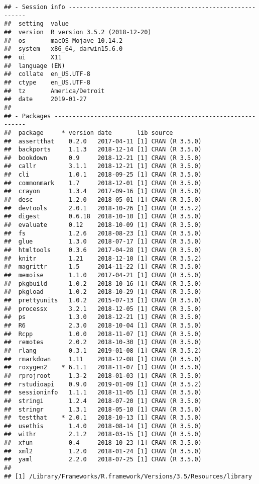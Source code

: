\documentclass[]{book}
\begin{document}
\begin{verbatim}
## - Session info ----------------------------------------------------------
##  setting  value                       
##  version  R version 3.5.2 (2018-12-20)
##  os       macOS Mojave 10.14.2        
##  system   x86_64, darwin15.6.0        
##  ui       X11                         
##  language (EN)                        
##  collate  en_US.UTF-8                 
##  ctype    en_US.UTF-8                 
##  tz       America/Detroit             
##  date     2019-01-27                  
## 
## - Packages --------------------------------------------------------------
##  package     * version date       lib source        
##  assertthat    0.2.0   2017-04-11 [1] CRAN (R 3.5.0)
##  backports     1.1.3   2018-12-14 [1] CRAN (R 3.5.0)
##  bookdown      0.9     2018-12-21 [1] CRAN (R 3.5.0)
##  callr         3.1.1   2018-12-21 [1] CRAN (R 3.5.0)
##  cli           1.0.1   2018-09-25 [1] CRAN (R 3.5.0)
##  commonmark    1.7     2018-12-01 [1] CRAN (R 3.5.0)
##  crayon        1.3.4   2017-09-16 [1] CRAN (R 3.5.0)
##  desc          1.2.0   2018-05-01 [1] CRAN (R 3.5.0)
##  devtools      2.0.1   2018-10-26 [1] CRAN (R 3.5.2)
##  digest        0.6.18  2018-10-10 [1] CRAN (R 3.5.0)
##  evaluate      0.12    2018-10-09 [1] CRAN (R 3.5.0)
##  fs            1.2.6   2018-08-23 [1] CRAN (R 3.5.0)
##  glue          1.3.0   2018-07-17 [1] CRAN (R 3.5.0)
##  htmltools     0.3.6   2017-04-28 [1] CRAN (R 3.5.0)
##  knitr         1.21    2018-12-10 [1] CRAN (R 3.5.2)
##  magrittr      1.5     2014-11-22 [1] CRAN (R 3.5.0)
##  memoise       1.1.0   2017-04-21 [1] CRAN (R 3.5.0)
##  pkgbuild      1.0.2   2018-10-16 [1] CRAN (R 3.5.0)
##  pkgload       1.0.2   2018-10-29 [1] CRAN (R 3.5.0)
##  prettyunits   1.0.2   2015-07-13 [1] CRAN (R 3.5.0)
##  processx      3.2.1   2018-12-05 [1] CRAN (R 3.5.0)
##  ps            1.3.0   2018-12-21 [1] CRAN (R 3.5.0)
##  R6            2.3.0   2018-10-04 [1] CRAN (R 3.5.0)
##  Rcpp          1.0.0   2018-11-07 [1] CRAN (R 3.5.0)
##  remotes       2.0.2   2018-10-30 [1] CRAN (R 3.5.0)
##  rlang         0.3.1   2019-01-08 [1] CRAN (R 3.5.2)
##  rmarkdown     1.11    2018-12-08 [1] CRAN (R 3.5.0)
##  roxygen2    * 6.1.1   2018-11-07 [1] CRAN (R 3.5.0)
##  rprojroot     1.3-2   2018-01-03 [1] CRAN (R 3.5.0)
##  rstudioapi    0.9.0   2019-01-09 [1] CRAN (R 3.5.2)
##  sessioninfo   1.1.1   2018-11-05 [1] CRAN (R 3.5.0)
##  stringi       1.2.4   2018-07-20 [1] CRAN (R 3.5.0)
##  stringr       1.3.1   2018-05-10 [1] CRAN (R 3.5.0)
##  testthat    * 2.0.1   2018-10-13 [1] CRAN (R 3.5.0)
##  usethis       1.4.0   2018-08-14 [1] CRAN (R 3.5.0)
##  withr         2.1.2   2018-03-15 [1] CRAN (R 3.5.0)
##  xfun          0.4     2018-10-23 [1] CRAN (R 3.5.0)
##  xml2          1.2.0   2018-01-24 [1] CRAN (R 3.5.0)
##  yaml          2.2.0   2018-07-25 [1] CRAN (R 3.5.0)
## 
## [1] /Library/Frameworks/R.framework/Versions/3.5/Resources/library
\end{verbatim}
\end{document}
